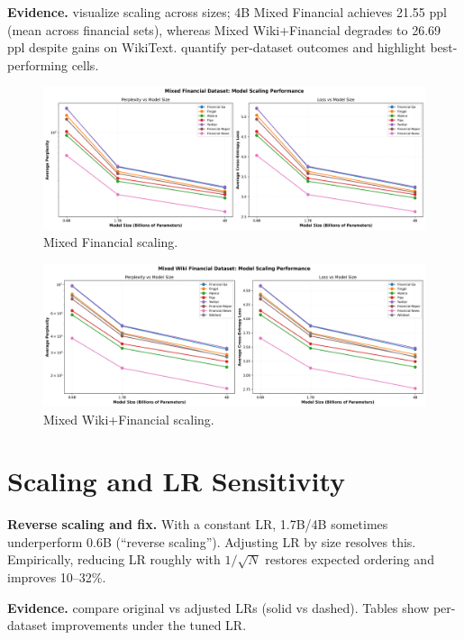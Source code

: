 \textbf{Evidence.}  visualize scaling across sizes; 4B Mixed Financial achieves 21.55 ppl (mean across financial sets), whereas Mixed Wiki+Financial degrades to 26.69 ppl despite gains on WikiText.  quantify per-dataset outcomes and highlight best-performing cells.

\begin{figure}[H]
  \centering
  \includegraphics[width=\textwidth]{../thesis/figures/scaling_mixed_financial.png}
  \caption{Mixed Financial scaling.}\label{fig:scaling_mixed_financial}
\end{figure}

\begin{figure}[H]
  \centering
  \includegraphics[width=\textwidth]{../thesis/figures/scaling_mixed_wiki_financial.png}
  \caption{Mixed Wiki+Financial scaling.}\label{fig:scaling_mixed_wiki_financial}
\end{figure}

\section{Scaling and LR Sensitivity}
\textbf{Reverse scaling and fix.} With a constant LR, 1.7B/4B sometimes underperform 0.6B (``reverse scaling''). Adjusting LR by size resolves this. Empirically, reducing LR roughly with $1/\sqrt{N}$ restores expected ordering and improves 10--32\%.

\textbf{Evidence.}  compare original vs adjusted LRs (solid vs dashed). Tables  show per-dataset improvements under the tuned LR.


